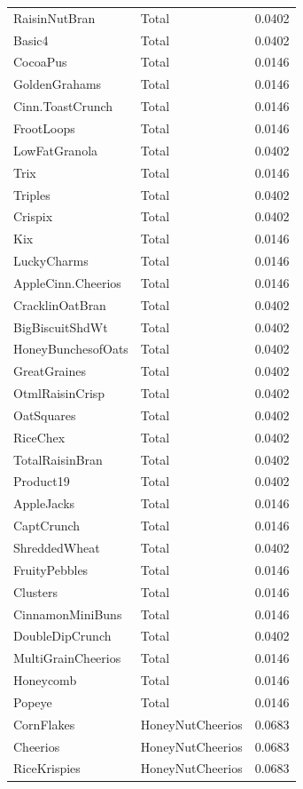 \begin{table}[!htbp]
\begin{tabular}{lll}
\\
RaisinNutBran & Total & 0.0402
\\
Basic4 & Total & 0.0402
\\
CocoaPus & Total & 0.0146
\\
GoldenGrahams & Total & 0.0146
\\
Cinn.ToastCrunch & Total & 0.0146
\\
FrootLoops & Total & 0.0146
\\
LowFatGranola & Total & 0.0402
\\
Trix & Total & 0.0146
\\
Triples & Total & 0.0402
\\
Crispix & Total & 0.0402
\\
Kix & Total & 0.0146
\\
LuckyCharms & Total & 0.0146
\\
AppleCinn.Cheerios & Total & 0.0146
\\
CracklinOatBran & Total & 0.0402
\\
BigBiscuitShdWt & Total & 0.0402
\\
HoneyBunchesofOats & Total & 0.0402
\\
GreatGraines & Total & 0.0402
\\
OtmlRaisinCrisp & Total & 0.0402
\\
OatSquares & Total & 0.0402
\\
RiceChex & Total & 0.0402
\\
TotalRaisinBran & Total & 0.0402
\\
Product19 & Total & 0.0402
\\
AppleJacks & Total & 0.0146
\\
CaptCrunch & Total & 0.0146
\\
ShreddedWheat & Total & 0.0402
\\
FruityPebbles & Total & 0.0146
\\
Clusters & Total & 0.0146
\\
CinnamonMiniBuns & Total & 0.0146
\\
DoubleDipCrunch & Total & 0.0402
\\
MultiGrainCheerios & Total & 0.0146
\\
Honeycomb & Total & 0.0146
\\
Popeye & Total & 0.0146
\\
CornFlakes & HoneyNutCheerios & 0.0683
\\
Cheerios & HoneyNutCheerios & 0.0683
\\
RiceKrispies & HoneyNutCheerios & 0.0683
\\

\end{tabular}
\end{table}
